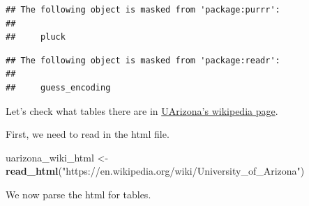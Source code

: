 \documentclass[
]{book}
\newenvironment{Shaded}{\begin{snugshade}}{\end{snugshade}}
\newcommand{\KeywordTok}[1]{\textcolor[rgb]{0.13,0.29,0.53}{\textbf{#1}}}
\newcommand{\NormalTok}[1]{#1}
\newcommand{\OperatorTok}[1]{\textcolor[rgb]{0.81,0.36,0.00}{\textbf{#1}}}
\newcommand{\StringTok}[1]{\textcolor[rgb]{0.31,0.60,0.02}{#1}}
\begin{document}
\begin{verbatim}
## The following object is masked from 'package:purrr':
## 
##     pluck
\end{verbatim}

\begin{verbatim}
## The following object is masked from 'package:readr':
## 
##     guess_encoding
\end{verbatim}

Let's check what tables there are in \href{https://en.wikipedia.org/wiki/University_of_Arizona}{UArizona's wikipedia page}.

First, we need to read in the html file.

\begin{Shaded}
\begin{Highlighting}[]
\NormalTok{uarizona_wiki_html <-}\StringTok{ }\KeywordTok{read_html}\NormalTok{(}\StringTok{"https://en.wikipedia.org/wiki/University_of_Arizona"}\NormalTok{)}
\end{Highlighting}
\end{Shaded}

We now parse the html for tables.

\begin{Shaded}
\end{Shaded}
\end{document}
